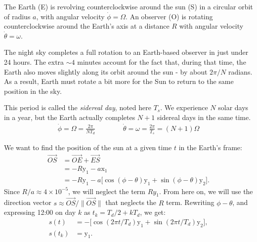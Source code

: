 \documentclass[12pt]{article}
\begin{document}
The Earth (E) is revolving counterclockwise around the sun (S) in a circular 
orbit of radius $a$, with angular velocity $\dot \phi=\Omega$.
An observer (O) is rotating counterclockwise around the Earth's axis at a 
distance $R$ with angular velocity $\dot \theta=\omega$.

The night sky completes a full rotation to an Earth-based observer in just 
under 24 hours. The extra $\sim 4$ minutes account for the fact that, during 
that time, the Earth also moves slightly along its orbit around the sun - by
about $2\pi/N$ radians. As a result, Earth must rotate a bit more for the 
Sun to return to the same position in the sky.

This period is called the \textit{sidereal day}, noted here $T_s$. 
We experience $N$ solar days in a year, but the Earth actually completes $N+1$ 
sidereal days in the same time.
\begin{align}
    \dot\phi = \Omega = \frac{2\pi}{N T_d} \qquad\qquad
    \dot\theta = \omega = \frac{2\pi}{T_s} = (N+1) \Omega
\end{align}

We want to find the position of the sun at a given time $t$ in the Earth's 
frame:
\begin{equation}
    \begin{aligned}
        \overrightarrow{OS} &= \overrightarrow{OE} + \overrightarrow{ES}\\
        &= -R \mathrm{y}_1 - a \mathrm{x}_1\\
        &= -R \mathrm{y}_1 - a \Big[\cos(\phi-\theta) \mathrm{y}_1 + \sin(\phi-\theta) \mathrm{y}_2\Big].
    \end{aligned}
\end{equation}
Since $R/a \approx 4\times 10^{-5}$, we will neglect the term $R y_1$.
From here on, we will use the direction vector 
$s\approx \overrightarrow{OS}/\|\overrightarrow{OS}\|$ that neglects
the $R$ term. Rewriting $\phi-\theta$, and expressing 12:00 on day $k$ 
as $t_{k}=T_d/2 + kT_d$, we get:
\begin{align}
    s(t) &= -\Big[\cos(2\pi t/T_d) \mathrm{y}_1 + \sin(2\pi t/T_d) \mathrm{y}_2\Big],\\
    s(t_{k}) &= \mathrm{y}_1.
\end{align}
\end{document}
